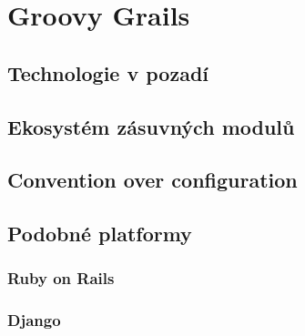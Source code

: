 \chapter{Groovy Grails}
\blindtext

\section{Technologie v pozadí}
\blindtext[1]

\section{Ekosystém zásuvných modulů}
\blindtext[1]

\section{Convention over configuration}
\blindtext[1]

\section{Podobné platformy}
\blindtext[1]

\subsection{Ruby on Rails}
\blindtext

\subsection{Django}
\blindtext

